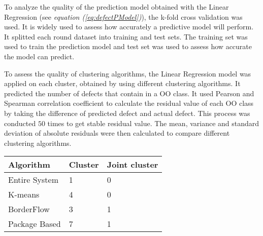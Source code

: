 \documentclass[12pt]{report}
\begin{document}
%

To analyze the quality of the prediction model obtained with the Linear Regression (see \textit{equation (\ref{eq:defectPModel})}), the k-fold cross validation was used. It is widely used to assess how accurately a predictive model will perform. It splitted each round dataset into training and test sets. The training set was used to train the prediction model and test set was used to assess how accurate the model can predict. 
 
To assess the quality of clustering algorithms, the Linear Regression model was applied on each cluster, obtained by using different clustering algorithms. It predicted the number of defects that contain in a OO class. It used Pearson and Spearman correlation coefficient to calculate the residual value of each OO class by taking the difference of predicted defect and actual defect. This process was conducted $50$ times to get stable residual value. The mean, variance and standard deviation of absolute residuals were then calculated to compare different clustering algorithms.


\begin{center}
\centering
{}
 \label{tab:title} 
    \begin{tabular}{ | p{4cm} | p{4cm} | p{4cm} |}
			\hline
					Algorithm & Cluster & Joint cluster \\ \hline
					Entire System &	1 &	0\\ \hline
					K-means &	4	& 0\\ \hline
					BorderFlow	& 3 &	1\\ \hline
					Package Based &	7 &	1\\ 
			\hline
    \end{tabular}
	\end{center}
\newpage
\end{document}
